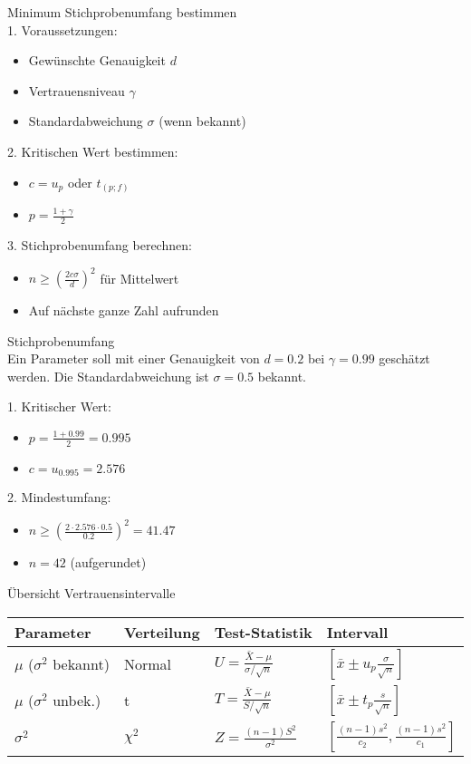 \begin{KR}{Minimum Stichprobenumfang bestimmen}\\
1. Voraussetzungen:
   \begin{itemize}
     \item Gewünschte Genauigkeit $d$
     \item Vertrauensniveau $\gamma$
     \item Standardabweichung $\sigma$ (wenn bekannt)
   \end{itemize}

2. Kritischen Wert bestimmen:
   \begin{itemize}
     \item $c=u_p$ oder $t_{(p;f)}$
     \item $p=\frac{1+\gamma}{2}$
   \end{itemize}

3. Stichprobenumfang berechnen:
   \begin{itemize}
     \item $n \geq (\frac{2c\sigma}{d})^2$ für Mittelwert
     \item Auf nächste ganze Zahl aufrunden
   \end{itemize}
\end{KR}

\begin{example2}{Stichprobenumfang}\\
Ein Parameter soll mit einer Genauigkeit von $d=0.2$ bei $\gamma=0.99$ geschätzt werden. Die Standardabweichung ist $\sigma=0.5$ bekannt.

1. Kritischer Wert:
   \begin{itemize}
     \item $p=\frac{1+0.99}{2}=0.995$
     \item $c=u_{0.995}=2.576$
   \end{itemize}

2. Mindestumfang:
   \begin{itemize}
     \item $n \geq (\frac{2 \cdot 2.576 \cdot 0.5}{0.2})^2=41.47$
     \item $n=42$ (aufgerundet)
   \end{itemize}
\end{example2}

\begin{concept}{Übersicht Vertrauensintervalle}\\
\begin{center}
\begin{tabular}{|l|l|l|l|}
\hline
Parameter & Verteilung & Test-Statistik & Intervall \\
\hline
$\mu$ ($\sigma^2$ bekannt) & Normal & $U=\frac{\bar{X}-\mu}{\sigma/\sqrt{n}}$ & $[\bar{x} \pm u_p \frac{\sigma}{\sqrt{n}}]$ \\
\hline
$\mu$ ($\sigma^2$ unbek.) & t & $T=\frac{\bar{X}-\mu}{S/\sqrt{n}}$ & $[\bar{x} \pm t_p \frac{s}{\sqrt{n}}]$ \\
\hline
$\sigma^2$ & $\chi^2$ & $Z=\frac{(n-1)S^2}{\sigma^2}$ & $[\frac{(n-1)s^2}{c_2}, \frac{(n-1)s^2}{c_1}]$ \\
\hline
\end{tabular}
\end{center}
\end{concept}

